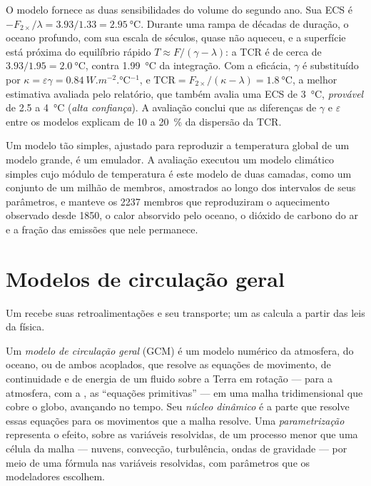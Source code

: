 O modelo fornece as duas sensibilidades do volume do segundo ano. Sua ECS é
$-F_{2\times}/\lambda = 3.93/1.33 = \qty{2.95}{\celsius}$. Durante uma rampa
de décadas de duração, o oceano profundo, com sua escala de séculos, quase não
aqueceu, e a superfície está próxima do equilíbrio rápido $T \approx F/(\gamma -
\lambda)$: a TCR é de cerca de $3.93/1.95 = \qty{2.0}{\celsius}$, contra
\qty{1.99}{\celsius} da integração. Com a eficácia, $\gamma$ é
substituído por $\kappa = \varepsilon\gamma = \qty{0.84}{W.m^{-2}.\celsius^{-1}}$,
e $\text{TCR} = F_{2\times}/(\kappa - \lambda) = \qty{1.8}{\celsius}$,
a melhor estimativa avaliada pelo relatório, que também avalia uma ECS de
\qty{3}{\celsius}, \emph{provável} de 2.5 a \qty{4}{\celsius} (\emph{alta
confiança}). A avaliação conclui que as diferenças de $\gamma$ e
$\varepsilon$ entre os modelos explicam de 10 a \qty{20}{\percent} da
dispersão da TCR.

Um modelo tão simples, ajustado para reproduzir a temperatura global de um modelo grande,
é um emulador. A avaliação executou um modelo climático simples cujo módulo de temperatura é
este modelo de duas camadas, como um conjunto de um milhão de membros, amostrados ao longo
dos intervalos de seus parâmetros, e manteve os 2237 membros que reproduziram o
aquecimento observado desde 1850, o calor absorvido pelo oceano, o dióxido de carbono
do ar e a fração das emissões que nele permanece.

\section{Modelos de circulação geral}\label{sec:b3:climate-models:gcm}

Um  recebe suas retroalimentações e seu transporte; um
 as calcula a partir das leis da física.

\begin{definition}\label{def:b3:climate-models:gcm}
Um \emph{modelo de circulação geral} (GCM)
é um modelo numérico da atmosfera, do oceano, ou de ambos acoplados,
que resolve as equações de movimento, de continuidade e de energia de um fluido
sobre a Terra em rotação --- para a atmosfera, com a ,
as ``equações primitivas'' --- em uma malha tridimensional que cobre o globo,
avançando no tempo. Seu \emph{núcleo
dinâmico} é a parte que resolve essas equações para
os movimentos que a malha resolve. Uma
\emph{parametrização} representa o efeito, sobre as
variáveis resolvidas, de um processo menor que uma célula da malha ---
nuvens, convecção, turbulência, ondas de gravidade ---
por meio de uma fórmula nas variáveis resolvidas, com parâmetros que os modeladores escolhem.
\end{definition}

